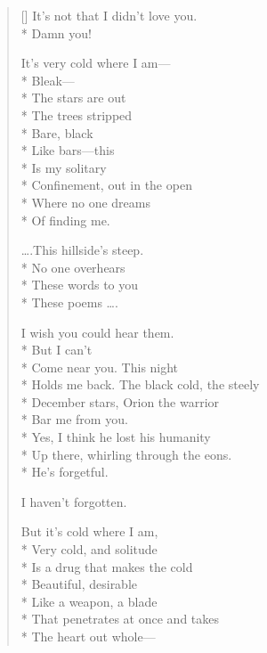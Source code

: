 \label{ch:blood_trail}
\settowidth{\versewidth}{Invisible and cold and silent.   I'll remain}
\begin{verse}[\versewidth]
It's not that I didn't love you.\\*
Damn you!

It's very cold where I am---\\*
Bleak---\\*
The stars are out\\*
The trees stripped\\*
Bare, black\\*
Like bars---this\\*
Is my solitary\\*
Confinement, out in the open\\*
Where no one dreams\\*
Of finding me.

\ldots .This hillside's steep.\\*
No one overhears\\*
These words to you\\*
These poems \ldots .

I wish you could hear them.\\*
But I can't\\*
Come near you.  This night\\*
Holds me back.   The black cold, the steely\\*
December stars, Orion the warrior\\*
Bar me from you.\\*
Yes, I think he lost his humanity\\*
Up there, whirling through the eons.\\*
He's forgetful.

I haven't forgotten.

But it's cold where I am,\\*
Very cold, and solitude\\*
Is a drug that makes the cold\\*
Beautiful, desirable\\*
Like a weapon, a blade\\*
That penetrates at once and takes\\*
The heart out whole---


\end{verse}
